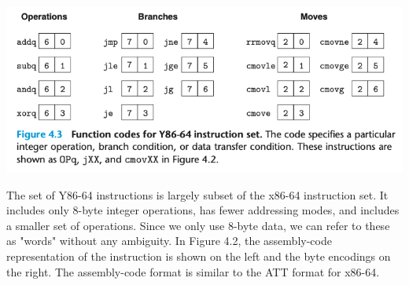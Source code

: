 \documentclass[11pt]{article}
\begin{document}
\begin{center}
\includegraphics[width=.9\linewidth]{pics/function-codes-for-y86-64-instruction-set.png}
\end{center}


The set of Y86-64 instructions is largely subset of the x86-64 instruction set. It includes only 8-byte integer operations, has fewer addressing modes, and includes a smaller set of operations. Since  we only use 8-byte data, we can refer to these as "words" without any ambiguity. In Figure 4.2, the assembly-code representation of the instruction is shown on the left and the byte encodings on the right. The assembly-code format is similar to the ATT format for x86-64.\\
\end{document}

